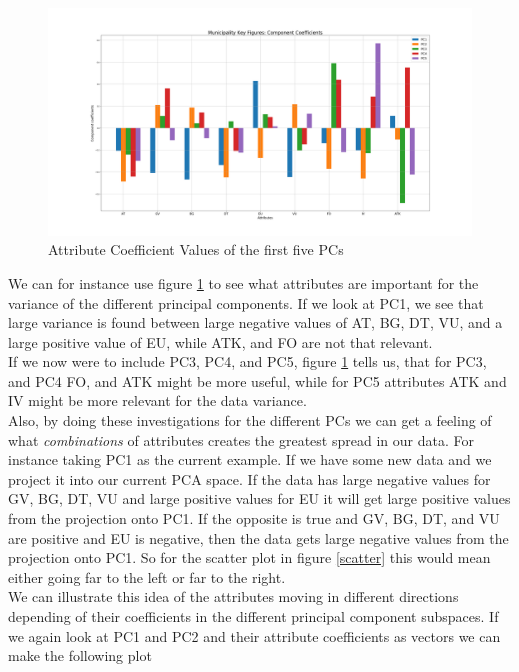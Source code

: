 \documentclass[11pt,fleqn]{article}
\numberwithin{footnote}{section}
\numberwithin{figure}{section}
\numberwithin{table}{section}
\begin{document}
\begin{figure}[H]
	\centering
	\includegraphics[width=\textwidth]{component_coefficients}
	\caption{Attribute Coefficient Values of the first five PCs}
	\label{att_coef}
\end{figure}\noindent
We can for instance use figure \ref{att_coef} to see what attributes are important for the variance of the different principal components.
If we look at PC1, we see that large variance is found between large negative values of AT, BG, DT, VU, and a large positive value of EU, while ATK, and FO are not that relevant.\\
If we now were to include PC3, PC4, and PC5, figure \ref{att_coef} tells us, that for PC3, and PC4 FO, and ATK might be more useful, while for PC5 attributes ATK and IV might be more relevant for the data variance.\\
Also, by doing these investigations for the different PCs we can get a feeling of what \textit{combinations} of attributes creates the greatest spread in our data.
For instance taking PC1 as the current example.
If we have some new data and we project it into our current PCA space.
If the data has large negative values for GV, BG, DT, VU and large positive values for EU it will get large positive values from the projection onto PC1.
If the opposite is true and GV, BG, DT, and VU are positive and EU is negative, then the data gets large negative values from the projection onto PC1.
So for the scatter plot in figure \ref{scatter} this would mean either going far to the left or far to the right.
\\
We can illustrate this idea of the attributes moving in different directions depending of their coefficients in the different principal component subspaces.
If we again look at PC1 and PC2 and their attribute coefficients as vectors we can make the following plot
\end{document}
